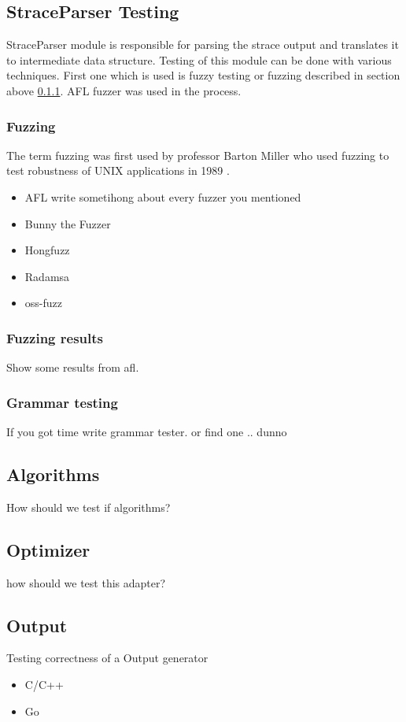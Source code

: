 \subsection{StraceParser Testing}
StraceParser module is responsible for parsing the strace output and translates it to intermediate data structure.
Testing of this module can be done with various techniques.
First one which is used is fuzzy testing or fuzzing described in section above \ref{fuzzing}.
AFL fuzzer was used in the process.
\subsubsection{Fuzzing}
\label{fuzzing}
The term fuzzing was first used by professor Barton Miller who used fuzzing to test robustness of UNIX applications in 1989 \cite{Takanen:2008:FSS:1404500, Marhefka2013}.

\begin{itemize}
	\item{AFL} write sometihong about every fuzzer you mentioned
	\item{Bunny the Fuzzer}
	\item{Hongfuzz}
	\item{Radamsa}
	\item{oss-fuzz}
\end{itemize}
\subsubsection{Fuzzing results}
Show some results from afl.
\subsubsection{Grammar testing}
If you got time write grammar tester. or find one .. dunno

\subsection{Algorithms}
How should we test if algorithms?
\subsection{Optimizer}
how should we test this adapter?
\subsection{Output}
Testing correctness of a Output generator
\begin{itemize}
	\item{C/C++}
	\item{Go}
\end{itemize}

